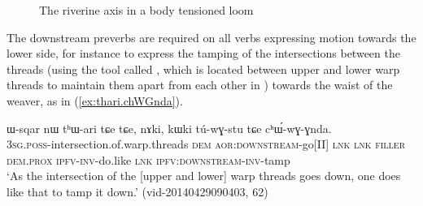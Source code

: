 \begin{figure} 
\caption{The riverine axis in a body tensioned loom}
\label{fig:loom1}
\end{figure}

The downstream preverbs are required on all verbs expressing motion towards the lower side, for instance to express the tamping of the intersections between the threads (using the tool called , which is located between upper and lower warp threads to maintain them apart from each other in ) towards the waist of the weaver, as in (\ref{ex:thari.chWGnda}).

 \begin{exe}
\ex \label{ex:thari.chWGnda}
\gll ɯ-sqar nɯ tʰɯ-ari tɕe tɕe, nɤki, kɯki tú-wɣ-stu tɕe cʰɯ́-wɣ-ɣnda. \\
\textsc{3sg}.\textsc{poss}-intersection.of.warp.threads \textsc{dem} \textsc{aor}:\textsc{downstream}-go[II] \textsc{lnk} \textsc{lnk} \textsc{filler} \textsc{dem}.\textsc{prox} \textsc{ipfv}-\textsc{inv}-do.like \textsc{lnk} \textsc{ipfv}:\textsc{downstream}-\textsc{inv}-tamp \\
\glt `As the intersection of the [upper and lower] warp threads goes down, one does like that to tamp it down.' (vid-20140429090403, 62)
\end{exe} 


